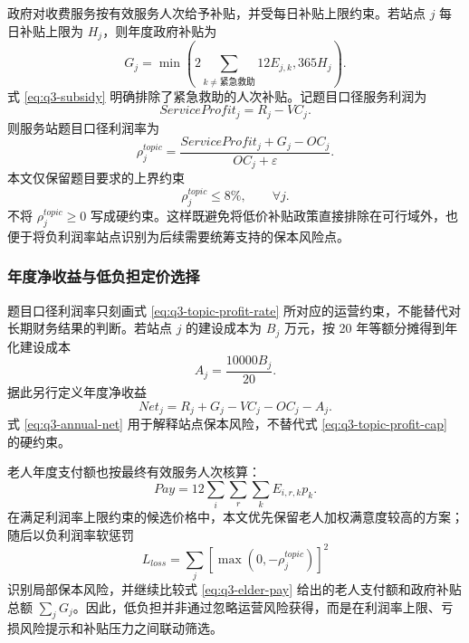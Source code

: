 政府对收费服务按有效服务人次给予补贴，并受每日补贴上限约束。若站点 $j$ 每日补贴上限为 $H_j$，则年度政府补贴为
\begin{equation}
  G_j=
  \min\left(
    2\sum_{k\ne\text{紧急救助}}12E_{j,k},
    365H_j
  \right).
  \label{eq:q3-subsidy}
\end{equation}
式 \eqref{eq:q3-subsidy} 明确排除了紧急救助的人次补贴。记题目口径服务利润为
\begin{equation}
  ServiceProfit_j=R_j-VC_j.
  \label{eq:q3-service-profit}
\end{equation}
则服务站题目口径利润率为
\begin{equation}
  \rho_j^{topic}
  =
  \frac{ServiceProfit_j+G_j-OC_j}{OC_j+\varepsilon}.
  \label{eq:q3-topic-profit-rate}
\end{equation}
本文仅保留题目要求的上界约束
\begin{equation}
  \rho_j^{topic}\le 8\%,
  \qquad \forall j.
  \label{eq:q3-topic-profit-cap}
\end{equation}
不将 $\rho_j^{topic}\ge0$ 写成硬约束。这样既避免将低价补贴政策直接排除在可行域外，也便于将负利润率站点识别为后续需要统筹支持的保本风险点。

\subsubsection{年度净收益与低负担定价选择}

题目口径利润率只刻画式 \eqref{eq:q3-topic-profit-rate} 所对应的运营约束，不能替代对长期财务结果的判断。若站点 $j$ 的建设成本为 $B_j$ 万元，按 20 年等额分摊得到年化建设成本
\begin{equation}
  A_j=\frac{10000B_j}{20}.
  \label{eq:q3-annualized-construction}
\end{equation}
据此另行定义年度净收益
\begin{equation}
  Net_j
  =
  R_j+G_j-VC_j-OC_j-A_j.
  \label{eq:q3-annual-net}
\end{equation}
式 \eqref{eq:q3-annual-net} 用于解释站点保本风险，不替代式 \eqref{eq:q3-topic-profit-cap} 的硬约束。

老人年度支付额也按最终有效服务人次核算：
\begin{equation}
  Pay
  =
  12\sum_i\sum_r\sum_kE_{i,r,k}p_k.
  \label{eq:q3-elder-pay}
\end{equation}
在满足利润率上限约束的候选价格中，本文优先保留老人加权满意度较高的方案；随后以负利润率软惩罚
\begin{equation}
  L_{loss}
  =
  \sum_j\left[\max\left(0,-\rho_j^{topic}\right)\right]^2
  \label{eq:q3-loss-penalty}
\end{equation}
识别局部保本风险，并继续比较式 \eqref{eq:q3-elder-pay} 给出的老人支付额和政府补贴总额 $\sum_jG_j$。因此，低负担并非通过忽略运营风险获得，而是在利润率上限、亏损风险提示和补贴压力之间联动筛选。

